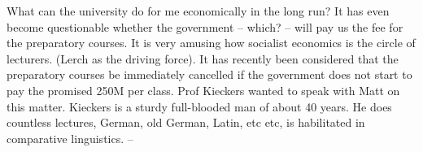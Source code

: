 What can the university do for me economically in the long run? It has even become questionable whether the government -- which? -- will pay us the fee for the preparatory courses. It is very amusing how socialist economics is  the circle of lecturers. (Lerch as the driving force). It has recently been considered that the preparatory courses be immediately cancelled if the government does not start to pay the promised 250M per class. Prof Kieckers wanted to speak with Matt on this matter. Kieckers is a sturdy full-blooded man of about 40 years. He does countless lectures, German, old German, Latin, etc etc, is habilitated in comparative linguistics. --


 
 